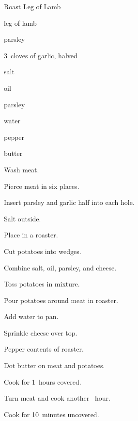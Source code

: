 \begin{recipe}{Roast Leg of Lamb}{}{}

\begin{ingredients}
\item leg of lamb
\item parsley
\item 3~cloves of garlic, halved
\item salt
\item oil
\item parsley
\item {}
\item \C{\half} water
\item pepper
\item butter
\end{ingredients}

\begin{directions}
\item Wash meat.
\item Pierce meat in six places.
\item Insert parsley and garlic half into each hole.
\item Salt outside.
\item Place in a roaster.
\item Cut potatoes into wedges.
\item Combine salt, oil, parsley, and cheese.
\item Toss potatoes in mixture.
\item Pour potatoes around meat in roaster.
\item Add water to pan.
\item Sprinkle cheese over top.
\item Pepper contents of roaster.
\item Dot butter on meat and potatoes.
\item Cook for 1\half~hours covered.
\item Turn meat and cook another \half~hour.
\item Cook for 10~minutes uncovered.
\end{directions}

\end{recipe}
